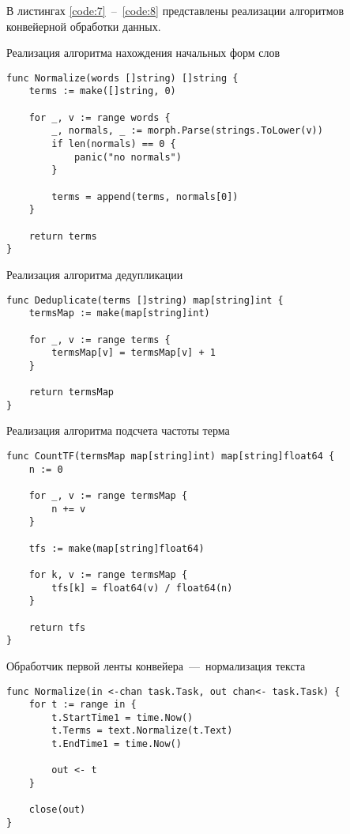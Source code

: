 В листингах \ref{code:7}~--~\ref{code:8} представлены реализации алгоритмов конвейерной обработки данных.

\newpage

\begin{code}
\caption{Реализация алгоритма нахождения начальных форм слов}
\label{code:1}
\begin{verbatim}
func Normalize(words []string) []string {
	terms := make([]string, 0)
	
	for _, v := range words {
		_, normals, _ := morph.Parse(strings.ToLower(v))
		if len(normals) == 0 {
			panic("no normals")
		}
		
		terms = append(terms, normals[0])
	}
	
	return terms
}
\end{verbatim}
\end{code}

\begin{code}
\caption{Реализация алгоритма дедупликации}
\label{code:2}
\begin{verbatim}
func Deduplicate(terms []string) map[string]int {
	termsMap := make(map[string]int)
	
	for _, v := range terms {
		termsMap[v] = termsMap[v] + 1
	}
	
	return termsMap
}
\end{verbatim}
\end{code}

\newpage

\begin{code}
\caption{Реализация алгоритма подсчета частоты терма}
\label{code:3}
\begin{verbatim}
func CountTF(termsMap map[string]int) map[string]float64 {
	n := 0
	
	for _, v := range termsMap {
		n += v
	}
	
	tfs := make(map[string]float64)
	
	for k, v := range termsMap {
		tfs[k] = float64(v) / float64(n)
	}
	
	return tfs
}
\end{verbatim}
\end{code}

\begin{code}
\caption{Обработчик первой ленты конвейера~---~нормализация текста}
\label{code:4}
\begin{verbatim}
func Normalize(in <-chan task.Task, out chan<- task.Task) {
	for t := range in {
		t.StartTime1 = time.Now()
		t.Terms = text.Normalize(t.Text)
		t.EndTime1 = time.Now()
		
		out <- t
	}
	
	close(out)
}
\end{verbatim}
\end{code}

